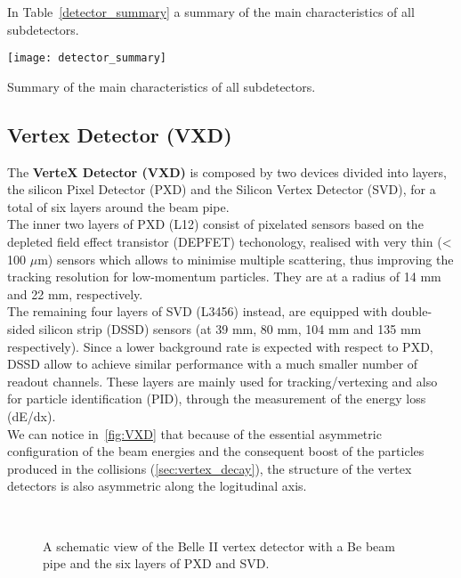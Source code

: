 In Table~\ref{detector_summary} a summary of the main characteristics of all subdetectors.

\begin{table}[h!]
\centering
\texttt{[image: detector\_summary]}
\caption{Summary of the main characteristics of all subdetectors.}
\label{detector_summary}
\end{table}


\subsection{Vertex Detector (VXD)}


The \textbf{VerteX Detector (VXD)} is composed by two devices divided into layers, the silicon Pixel Detector (PXD) and the Silicon Vertex Detector (SVD), for a total of six layers around the beam pipe.\\
The inner two layers of PXD (L12) consist of pixelated sensors based on the depleted field effect transistor (DEPFET) techonology, realised with very thin (< 100 $\mu$m) sensors which allows to minimise multiple scattering, thus improving the tracking resolution for low-momentum particles. They are at a radius of 14 mm and 22 mm, respectively. \\
The remaining four layers of SVD (L3456) instead, are equipped with double-sided silicon strip (DSSD) sensors (at 39 mm, 80 mm, 104 mm and 135 mm respectively). Since a lower background rate is expected with respect to PXD, DSSD allow to achieve similar performance with a much smaller number of readout channels.
These layers are mainly used for tracking/vertexing and also for particle identification (PID), through the measurement of the energy loss (dE/dx).\\

We can notice in~\autoref{fig:VXD} that because of the essential asymmetric configuration of the beam energies and the consequent boost of the particles produced in the collisions (\autoref{sec:vertex_decay}), the structure of the vertex detectors is also asymmetric along the logitudinal axis.

\begin{figure}[h!]
\centering
{}\quad
{}\\
\caption{A schematic view of the Belle II vertex detector with a Be beam pipe and the six layers of PXD and SVD.}
\label{fig:VXD}
\end{figure}


